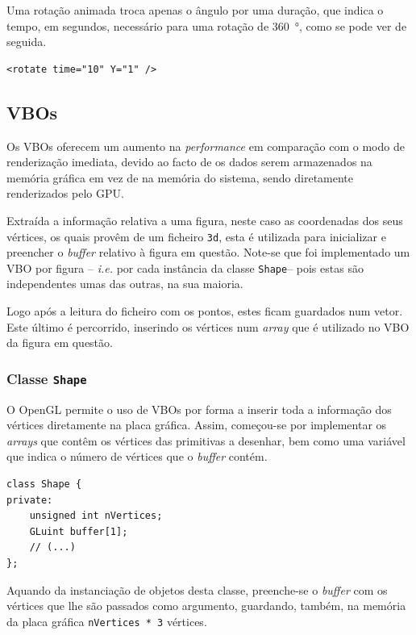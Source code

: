 \documentclass[a4paper, 11pt]{article}
\begin{document}
Uma rotação animada troca apenas o ângulo por uma duração, que indica o tempo, em segundos, 
necessário para uma rotação de \SI{360}{\degree}, como se pode ver de seguida.

\begin{verbatim}
<rotate time="10" Y="1" />
\end{verbatim}

\subsection{VBOs}

Os VBOs oferecem um aumento na \textit{performance} em comparação com o modo de renderização 
imediata, devido ao facto de os dados serem armazenados na memória gráfica em vez de na memória 
do sistema, sendo diretamente renderizados pelo GPU. 

Extraída a informação relativa a uma figura, neste caso as coordenadas dos seus vértices, os 
quais provêm de um ficheiro \texttt{3d}, esta é utilizada para inicializar e preencher o 
\textit{buffer} relativo à figura em questão. Note-se que foi implementado um VBO por figura -- 
\textit{i.e.} por cada instância da classe \texttt{Shape}-- pois estas são independentes umas das 
outras, na sua maioria.

Logo após a leitura do ficheiro com os pontos, estes ficam guardados num vetor. Este último é 
percorrido, inserindo os vértices num \textit{array} que é utilizado no VBO da figura em questão.

\subsubsection{Classe \texttt{Shape}}

O OpenGL permite o uso de VBOs por forma a inserir toda a informação dos vértices diretamente na 
placa gráfica. Assim, começou-se por implementar os \textit{arrays} que contêm os vértices das 
primitivas a desenhar, bem como uma variável que indica o número de vértices que o 
\textit{buffer} contém.

\begin{verbatim}
class Shape {
private:
    unsigned int nVertices;
    GLuint buffer[1];
    // (...)
};
\end{verbatim}

Aquando da instanciação de objetos desta classe, preenche-se o \textit{buffer} com os vértices 
que lhe são passados como argumento, guardando, também, na memória da placa gráfica 
\texttt{nVertices * 3} vértices.
\end{document}
